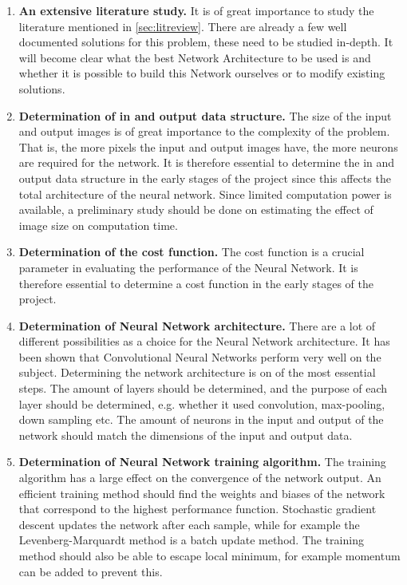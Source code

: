\begin{enumerate}
\item	\textbf{An extensive literature study.}
It is of great importance to study the literature mentioned in \ref{sec:litreview}. There are already a few well documented solutions for this problem, these need to be studied in-depth. It will become clear what the best Network Architecture to be used is and whether it is possible to build this Network ourselves or to modify existing solutions.

\item \textbf{Determination of in and output data structure.}
The size of the input and output images is of great importance to the complexity of the problem. That is, the more pixels the input and output images have, the more neurons are required for the network. It is therefore essential to determine the in and output data structure in the early stages of the project since this affects the total architecture of the neural network. Since limited computation power is available, a preliminary study should be done on estimating the effect of image size on computation time. 

\item \textbf{Determination of the cost function.}
The cost function is a crucial parameter in evaluating the performance of the Neural Network. It is therefore essential to determine a cost function in the early stages of the project.

\item \textbf{Determination of Neural Network architecture.}
There are a lot of different possibilities as a choice for the Neural Network architecture. It has been shown \cite{AutomaticColorization} that Convolutional Neural Networks perform very well on the subject. Determining the network architecture is on of the most essential steps. The amount of layers should be determined, and the purpose of each layer should be determined, e.g. whether it used convolution, max-pooling, down sampling etc. The amount of neurons in the input and output of the network should match the dimensions of the input and output data. 

\item \textbf{Determination of Neural Network training algorithm.}
The training algorithm has a large effect on the convergence of the network output. An efficient training method should find the  weights and biases of the network that correspond to the highest performance function. Stochastic gradient descent updates the network after each sample, while for example the Levenberg-Marquardt method is a batch update method. The training method should also be able to escape local minimum, for example momentum can be added to prevent this.


\end{enumerate}

